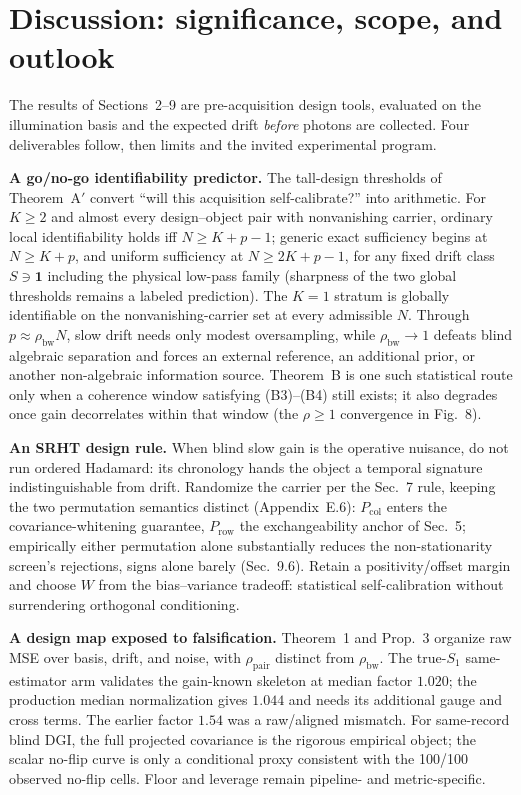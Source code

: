 \section{Discussion: significance, scope, and outlook}

The results of Sections~2--9 are pre-acquisition design tools, evaluated on the illumination basis and the expected drift \emph{before} photons are collected. Four deliverables follow, then limits and the invited experimental program.

\noindent\textbf{A go/no-go identifiability predictor.} The tall-design thresholds of Theorem~A$'$ convert ``will this acquisition self-calibrate?'' into arithmetic. For $K\ge2$ and almost every design--object pair with nonvanishing carrier, ordinary local identifiability holds iff $N\ge K+p-1$; generic exact sufficiency begins at $N\ge K+p$, and uniform sufficiency at $N\ge 2K+p-1$, for any fixed drift class $S\ni\mathbf 1$ including the physical low-pass family (sharpness of the two global thresholds remains a labeled prediction). The $K=1$ stratum is globally identifiable on the nonvanishing-carrier set at every admissible $N$. Through $p\approx\rho_{\mathrm{bw}}N$, slow drift needs only modest oversampling, while $\rho_{\mathrm{bw}}\to1$ defeats blind algebraic separation and forces an external reference, an additional prior, or another non-algebraic information source. Theorem~B is one such statistical route only when a coherence window satisfying (B3)--(B4) still exists; it also degrades once gain decorrelates within that window (the $\rho\ge1$ convergence in Fig.~8).

\noindent\textbf{An SRHT design rule.} When blind slow gain is the operative nuisance, do not run ordered Hadamard: its chronology hands the object a temporal signature indistinguishable from drift. Randomize the carrier per the Sec.~7 rule, keeping the two permutation semantics distinct (Appendix~E.6): $P_{\mathrm{col}}$ enters the covariance-whitening guarantee, $P_{\mathrm{row}}$ the exchangeability anchor of Sec.~5; empirically either permutation alone substantially reduces the non-stationarity screen's rejections, signs alone barely (Sec.~9.6). Retain a positivity/offset margin and choose $W$ from the bias--variance tradeoff: statistical self-calibration without surrendering orthogonal conditioning.

\noindent\textbf{A design map exposed to falsification.} Theorem~1 and Prop.~3 organize raw MSE over basis, drift, and noise, with $\rho_{\mathrm{pair}}$ distinct from $\rho_{\mathrm{bw}}$. The true-$S_1$ same-estimator arm validates the gain-known skeleton at median factor $1.020$; the production median normalization gives $1.044$ and needs its additional gauge and cross terms. The earlier factor $1.54$ was a raw/aligned mismatch. For same-record blind DGI, the full projected covariance is the rigorous empirical object; the scalar no-flip curve is only a conditional proxy consistent with the 100/100 observed no-flip cells. Floor and leverage remain pipeline- and metric-specific.

